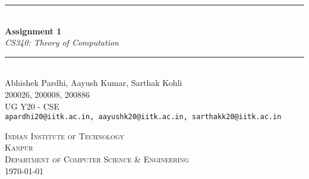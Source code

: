 \documentclass[12pt,a4paper]{article}
\newcommand{\HRule}{\rule{\linewidth}{0.5mm}}
\begin{document}
\begin{titlepage}
\begin{center}



\HRule \\[0.4cm]
{ \LARGE 
  \textbf{Assignment 1}\\[0.4cm]
  \emph{CS340: Theory of Computation}\\[0.4cm]
}
\HRule \\[1.5cm]



{ \large
  Abhishek Pardhi, Aayush Kumar, Sarthak Kohli\\[0.1cm]
  200026, 200008, 200886\\[0.1cm]
  UG Y20 - CSE\\[0.1cm]
  \texttt{apardhi20@iitk.ac.in, aayushk20@iitk.ac.in, sarthakk20@iitk.ac.in}
}

\vfill

\textsc{\Large Indian Institute of Technology\\Kanpur}\\[0.4cm]
\textsc{\large Department of Computer Science \& Engineering }\\[0.4cm]


{\large \today}
 
\end{center}
\end{titlepage}



\newpage



\tableofcontents
{}
\newpage
\setcounter{page}{1}

\end{document}
